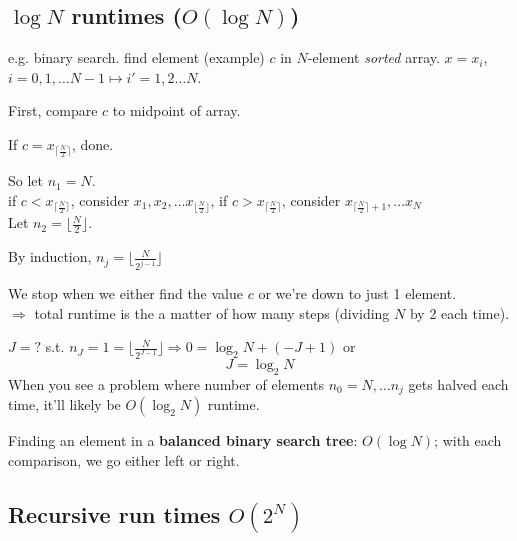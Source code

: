 \documentclass[10pt]{amsart}
\begin{document}
\begin{multicols*}{2}
\subsection{$\log{N}$ runtimes ($O(\log{N})$)} 

e.g. binary search. find element (example) $c$ in $N$-element \emph{sorted} array. $x= x_i$, $i=0,1, \dots N-1 \mapsto i' = 1, 2 \dots N$. 

First, compare $c$ to midpoint of array. 

If $c= x_{ \lceil \frac{N}{2} \rceil }$, done.

So let $n_1 =N$.  \\

if $c< x_{ \lceil \frac{N}{2} \rceil }$, consider $x_1, x_2, \dots x_{ \lfloor \frac{N}{2} \rfloor }$, if $c> x_{ \lceil \frac{N}{2} \rceil }$, consider $x_{ \lceil \frac{N}{2} \rceil + 1},  \dots x_N$ \\
 
Let $n_2= \lfloor \frac{N}{2} \rfloor$. 

By induction, $n_j = \lfloor \frac{N}{2^{j-1}} \rfloor$

We stop when we either find the value $c$ or we're down to just 1 element. \\
$\Longrightarrow $ total runtime is the a matter of how many steps (dividing $N$ by 2 each time).

$J = ?$ s.t. $n_J = 1 = \lfloor \frac{N}{2^{J-1}} \rfloor \Longrightarrow  0 = \log_2{N} + (-J + 1)$ or 
\[
J = \log_2{N}
\]
When you see a problem where number of elements $n_0 = N, \dots n_j$ gets halved each time, it'll likely be $O(\log_2{N})$ runtime. 

Finding an element in a \textbf{balanced binary search tree}: $O(\log{N})$; with each comparison, we go either left or right.

\subsection{Recursive run times $O(2^N)$}


\end{multicols*}
\end{document}
